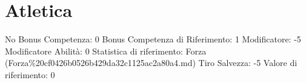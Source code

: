 \section{Atletica}\label{atletica}

\begin{description}
\tightlist
\item[Tags: ABI]
No Bonus Competenza: 0 Bonus Competenza di Riferimento: 1 Modificatore:
-5 Modificatore Abilità: 0 Statistica di riferimento: Forza
(Forza\%20cf0426b0526b429da32c1125ac2a80a4.md) Tiro Salvezza: -5 Valore
di riferimento: 0
\end{description}
